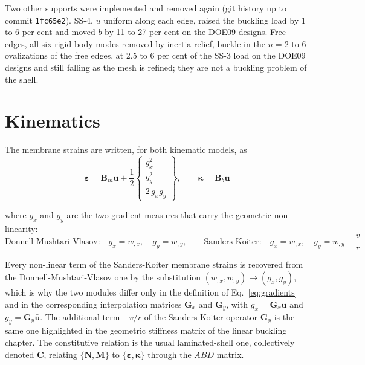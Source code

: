\documentclass[11pt,a4paper]{article}
\begin{document}
Two other supports were implemented and removed again (git history up to
commit \texttt{1fc65e2}).  SS-4, $u$ uniform along each edge, raised the
buckling load by 1 to 6 per cent and moved $b$ by 11 to 27 per cent on the
DOE09 designs.  Free edges, all six rigid body modes removed by inertia
relief, buckle in the $n = 2$ to 6 ovalizations of the free edges, at 2.5 to
6 per cent of the SS-3 load on the DOE09 designs and still falling as the
mesh is refined; they are not a buckling problem of the shell.

\section{Kinematics}

The membrane strains are written, for both kinematic models, as
\begin{equation}\label{eq:strain}
	\boldsymbol{\varepsilon}
	= \boldsymbol{B}_m\boldsymbol{\bar{u}}
	+ \frac{1}{2}
	\begin{Bmatrix} g_x^2 \\ g_y^2 \\ 2\,g_x g_y \end{Bmatrix},
	\qquad
	\boldsymbol{\kappa} = \boldsymbol{B}_b\boldsymbol{\bar{u}}
\end{equation}

\noindent where $g_x$ and $g_y$ are the two gradient measures that carry
the geometric non-linearity:
\begin{equation}\label{eq:gradients}
	\text{Donnell-Mushtari-Vlasov:}\quad
	g_x = w_{,x},\quad g_y = w_{,y},
	\qquad
	\text{Sanders-Koiter:}\quad
	g_x = w_{,x},\quad g_y = w_{,y} - \frac{v}{r}
\end{equation}

Every non-linear term of the Sanders-Koiter membrane strains is recovered from
the Donnell-Mushtari-Vlasov one by the substitution
$(w_{,x},w_{,y})\rightarrow(g_x,g_y)$, which is why the two modules
differ only in the definition of Eq.~\ref{eq:gradients} and in the
corresponding interpolation matrices $\boldsymbol{G}_x$ and
$\boldsymbol{G}_y$, with $g_x = \boldsymbol{G}_x\boldsymbol{\bar{u}}$ and
$g_y = \boldsymbol{G}_y\boldsymbol{\bar{u}}$.  The additional term
$-v/r$ of the Sanders-Koiter operator $\boldsymbol{G}_y$ is the same one
highlighted in the geometric stiffness matrix of the linear buckling chapter.
The constitutive relation is the usual laminated-shell one, collectively
denoted $\boldsymbol{C}$, relating $\{\boldsymbol{N},\boldsymbol{M}\}$ to
$\{\boldsymbol{\varepsilon},\boldsymbol{\kappa}\}$ through the $ABD$ matrix.
\end{document}
